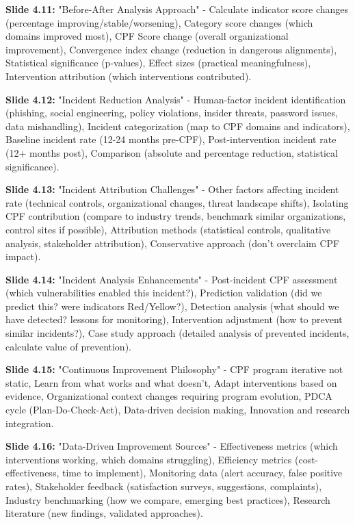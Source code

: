 \documentclass[11pt,a4paper]{article}
\begin{document}
\textbf{Slide 4.11:} "Before-After Analysis Approach" - Calculate indicator score changes (percentage improving/stable/worsening), Category score changes (which domains improved most), CPF Score change (overall organizational improvement), Convergence index change (reduction in dangerous alignments), Statistical significance (p-values), Effect sizes (practical meaningfulness), Intervention attribution (which interventions contributed).

\textbf{Slide 4.12:} "Incident Reduction Analysis" - Human-factor incident identification (phishing, social engineering, policy violations, insider threats, password issues, data mishandling), Incident categorization (map to CPF domains and indicators), Baseline incident rate (12-24 months pre-CPF), Post-intervention incident rate (12+ months post), Comparison (absolute and percentage reduction, statistical significance).

\textbf{Slide 4.13:} "Incident Attribution Challenges" - Other factors affecting incident rate (technical controls, organizational changes, threat landscape shifts), Isolating CPF contribution (compare to industry trends, benchmark similar organizations, control sites if possible), Attribution methods (statistical controls, qualitative analysis, stakeholder attribution), Conservative approach (don't overclaim CPF impact).

\textbf{Slide 4.14:} "Incident Analysis Enhancements" - Post-incident CPF assessment (which vulnerabilities enabled this incident?), Prediction validation (did we predict this? were indicators Red/Yellow?), Detection analysis (what should we have detected? lessons for monitoring), Intervention adjustment (how to prevent similar incidents?), Case study approach (detailed analysis of prevented incidents, calculate value of prevention).

\textbf{Slide 4.15:} "Continuous Improvement Philosophy" - CPF program iterative not static, Learn from what works and what doesn't, Adapt interventions based on evidence, Organizational context changes requiring program evolution, PDCA cycle (Plan-Do-Check-Act), Data-driven decision making, Innovation and research integration.

\textbf{Slide 4.16:} "Data-Driven Improvement Sources" - Effectiveness metrics (which interventions working, which domains struggling), Efficiency metrics (cost-effectiveness, time to implement), Monitoring data (alert accuracy, false positive rates), Stakeholder feedback (satisfaction surveys, suggestions, complaints), Industry benchmarking (how we compare, emerging best practices), Research literature (new findings, validated approaches).
\end{document}
